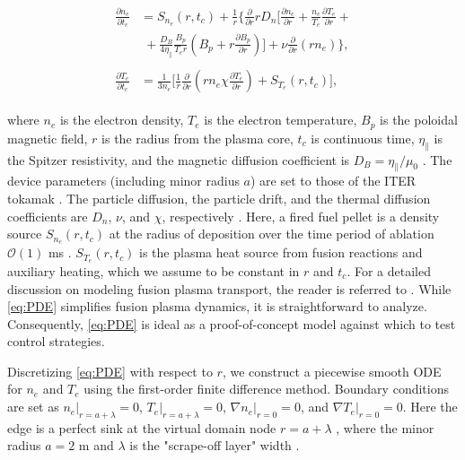 \documentclass[journal,twoside,web]{ieeecolor}
\begin{document}
\begin{subequations}
\begin{align}
    \begin{split}
	\frac{\partial n_e}{\partial t_c} &= S_{n_e}(r,t_c) + \frac{1}{r} \biggl\{ \frac{\partial}{\partial r} rD_n \biggl[ \frac{\partial n_e}{\partial r} + \frac{n_e}{T_e}\frac{\partial T_e}{\partial r} +\\
    &\; + \frac{D_B}{4\eta_\parallel}\frac{B_p}{T_e r}\left(B_p+r\frac{\partial B_p}{\partial r}\right) \biggr] + \nu \frac{\partial}{\partial r}\left(rn_e\right) \biggr\} ,\label{eq:dndt}
    \end{split}\\
	\begin{split}
		\frac{\partial T_e}{\partial t_c} &= \frac{1}{3n_e} \biggl[ \frac{1}{r}\frac{\partial}{\partial r} \left(rn_e\chi \frac{\partial T_e}{\partial r} \right) + S_{T_e}(r,t_c)\biggr], \label{eq:dTdt}
	\end{split}
\end{align} \label{eq:PDE}
\end{subequations} 

\noindent where $n_e$ is the electron density, $T_e$ is the electron temperature, $B_p$ is the poloidal magnetic field, $r$ is the radius from the plasma core, $t_c$ is continuous time, $\eta_{\parallel}$ is the Spitzer resistivity, and the magnetic diffusion coefficient is $D_B=\eta_{\parallel}/\mu_0$  \cite{Freidberg2007, Blanken2018}. The device parameters (including minor radius $a$) are set to those of the ITER tokamak \cite{Garzotti2019}. The particle diffusion, the particle drift, and the thermal diffusion coefficients are $D_n$, $\nu$, and $\chi$, respectively \cite{Na2019, Polevoi2002}. Here, a fired fuel pellet is a density source $S_{n_e}(r,t_c)$ at the radius of deposition over the time period of ablation $\mathcal{O}(1)$ ms \cite{Pegourie_2009}. $S_{T_e}(r,t_c)$ is the plasma heat source from fusion reactions and auxiliary heating, which we assume to be constant in $r$ and $t_c$. For a detailed discussion on modeling fusion plasma transport, the reader is referred to \cite{Freidberg2007}. While \eqref{eq:PDE} simplifies fusion plasma dynamics, it is straightforward to analyze. Consequently, \eqref{eq:PDE} is ideal as a proof-of-concept model against which to test control strategies.

Discretizing \eqref{eq:PDE} with respect to $r$, we construct a piecewise smooth ODE for $n_e$ and $T_e$ using the first-order finite difference method. Boundary conditions are set as $n_e|_{r=a + \lambda}=0$, $T_e|_{r=a + \lambda}=0$, $\nabla n_e|_{r=0}=0$, and $\nabla T_e|_{r=0}=0$. Here the edge is a perfect sink at the virtual domain node $r = a + \lambda$ \cite{Blanken2018}, where the minor radius $a = 2$ m and $\lambda$ is the "scrape-off layer" width \cite{Garzotti2019}. 
\end{document}

